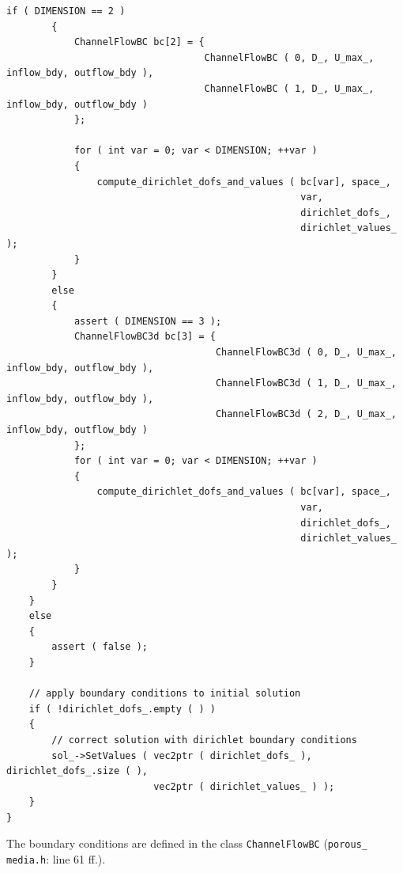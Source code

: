 \documentclass{article}
\begin{document}
\begin{lstlisting}[firstnumber=410]
        if ( DIMENSION == 2 )
        {
            ChannelFlowBC bc[2] = {
                                   ChannelFlowBC ( 0, D_, U_max_, inflow_bdy, outflow_bdy ),
                                   ChannelFlowBC ( 1, D_, U_max_, inflow_bdy, outflow_bdy )
            };

            for ( int var = 0; var < DIMENSION; ++var )
            {
                compute_dirichlet_dofs_and_values ( bc[var], space_, 
                                                    var,
                                                    dirichlet_dofs_, 
                                                    dirichlet_values_ );
            }
        }
        else
        {
            assert ( DIMENSION == 3 );
            ChannelFlowBC3d bc[3] = {
                                     ChannelFlowBC3d ( 0, D_, U_max_, inflow_bdy, outflow_bdy ),
                                     ChannelFlowBC3d ( 1, D_, U_max_, inflow_bdy, outflow_bdy ),
                                     ChannelFlowBC3d ( 2, D_, U_max_, inflow_bdy, outflow_bdy )
            };
            for ( int var = 0; var < DIMENSION; ++var )
            {
                compute_dirichlet_dofs_and_values ( bc[var], space_, 
                                                    var,
                                                    dirichlet_dofs_, 
                                                    dirichlet_values_ );
            }
        }
    }
    else
    {
        assert ( false );
    }

    // apply boundary conditions to initial solution
    if ( !dirichlet_dofs_.empty ( ) )
    {
        // correct solution with dirichlet boundary conditions
        sol_->SetValues ( vec2ptr ( dirichlet_dofs_ ), dirichlet_dofs_.size ( ),
                          vec2ptr ( dirichlet_values_ ) );
    }
}
\end{lstlisting}

\vspace*{15pt}
The boundary conditions are defined in the class \texttt{ChannelFlowBC} (\texttt{porous\_ media.h}: line 61 ff.).
\end{document}
